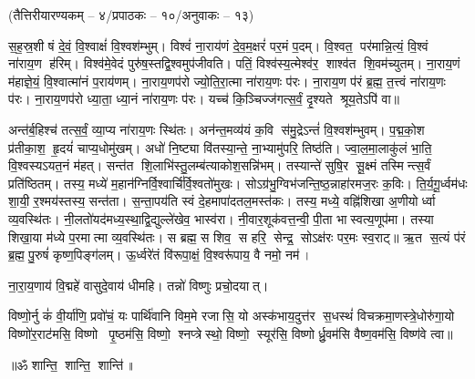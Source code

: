 

\centerline{\normalsize(तैत्तिरीयारण्यकम् – ४/प्रपाठकः – १०/अनुवाकः – १३)}

स॒ह॒स्र॒शी\sr%
षं दे॒वं॒ वि॒श्वाक्षं॑ वि॒श्वश॑म्भुम्। विश्वं॑ ना॒राय॑णं दे॒व॒म॒क्षरं॑ पर॒मं प॒दम्। 
वि॒श्वत॒ पर॑मान्नि॒त्यं॒ वि॒श्वं ना॑राय॒ण ह॑रिम्। विश्व॑मे॒वेदं पुरु॑ष॒स्तद्वि॒श्वमुप॑जीवति। 
पतिं॒   विश्व॑स्य॒\aav{}\aav{}त्मेश्व॑र॒ शाश्व॑त शि॒वम॑च्युतम्। ना॒राय॒णं म॑हाज्ञे॒यं॒ वि॒श्वात्मा॑नं प॒राय॑णम्। ना॒राय॒णप॑रो ज्यो॒ति॒रा॒त्मा ना॑राय॒णः प॑रः। ना॒राय॒ण प॑रं ब्र॒ह्म॒ त॒त्त्वं ना॑राय॒णः प॑रः। ना॒राय॒णप॑रो ध्या॒ता॒ ध्या॒नं ना॑राय॒णः प॑रः। यच्च॑ कि॒ञ्चिज्ज॑गत्स॒र्वं॒ दृ॒श्यते श्रूय॒तेऽपि॑ वा॥ 

अन्त॑र्ब॒हिश्च॑ तत्स॒र्वं॒ व्या॒प्य ना॑राय॒णः स्थि॑तः। अन॑न्त॒मव्य॑यं क॒वि स॑मु॒द्रेऽन्तं॑  वि॒श्वश॑म्भुवम्। प॒द्म॒को॒श प्र॑तीका॒श॒ हृ॒दयं॑ चाप्य॒धोमु॑खम्। अधो॑ नि॒ष्ट्या वि॑तस्या॒न्ते॒ ना॒भ्यामु॑परि॒ तिष्ठ॑ति। ज्वा॒ल॒मा॒लाकु॑लं भा॒ति॒ वि॒श्वस्यऽ\sav{}यत॒नं म॑हत्। सन्त॑त शि॒लाभि॑स्तु॒\-लम्ब॑त्याकोश॒सन्नि॑भम्। तस्यान्ते॑ सुषि॒र सू॒क्ष्मं तस्मिन्त्स॒र्वं प्रति॑ष्ठितम्। तस्य॒ मध्ये॑ म॒हान॑\-ग्निर्वि॒श्वार्चि॑र्वि॒श्वतो॑मुखः। सोऽग्र॑भु॒ग्विभ॑जन्ति॒ष्ठ॒न्नाहा॑रमज॒रः क॒विः। ति॒र्य॒गू॒र्ध्वम॑धः शा॒यी॒ र॒श्मय॑स्तस्य॒ सन्त॑ता। स॒न्ता॒पय॑ति स्वं दे॒हमापा॑दतल॒मस्त॑कः। तस्य॒ मध्ये॒ वह्नि॑शिखा अ॒णीयोर्ध्वा व्य॒वस्थि॑तः। नी॒लतो॑यद॑\-मध्य॒स्था॒द्वि॒द्युल्ले॑खेव॒  भास्व॑रा। नी॒वार॒शूक॑वत्त॒न्वी॒ पी॒ता भास्वत्य॒णूप॑मा। तस्या शिखा॒या म॑ध्ये प॒रमात्मा व्य॒वस्थि॑तः। स ब्रह्म॒ स शिव॒ स हरि॒ सेन्द्र॒ सोऽक्ष॑रः पर॒मः स्व॒राट्॥ 
ऋ॒त स॒त्यं प॑रं ब्र॒ह्म॒ पु॒रुषं॑ कृष्ण॒पिङ्ग॑लम्। ऊ॒र्ध्वरे॑तं वि॑रूपा॒क्षं॒ वि॒श्वरू॑पाय॒ वै नमो॒ नम॑। 

ना॒रा॒य॒णाय॑ वि॒द्महे॑ वासुदे॒वाय॑ धीमहि। तन्नो॑ विष्णुः प्रचो॒दयात्। 

विष्णो॒र्नु कं॑ वी॒र्या॑णि॒ प्रवो॑चं॒ यः पार्थि॑वानि विम॒मे रजासि॒ यो अस्क॑भाय॒दुत्त॑र स॒धस्थं॑ विचक्रमा॒णस्त्रे॒धोरु॑गा॒यो विष्णो॑र॒राट॑मसि॒ विष्णो पृ॒ष्ठम॑सि॒ विष्णो॒ श्नप्त्रेस्थो॒ विष्णो॒ स्यूर॑सि॒ विष्णोर्ध्रु॒वम॑सि वैष्ण॒वम॑सि॒ विष्ण॑वे त्वा॥ 

\centerline{॥ॐ शान्ति॒ शान्ति॒ शान्ति॑॥}